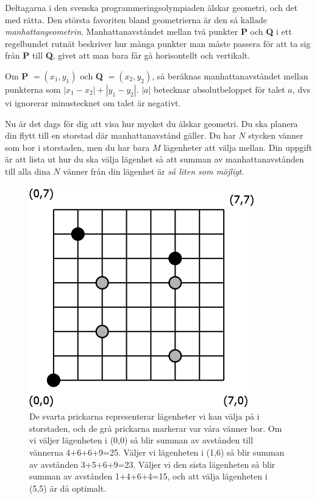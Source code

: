 
Deltagarna i den svenska programmeringsolympiaden älskar geometri, och det med rätta. Den största
favoriten bland geometrierna är den så kallade \emph{manhattangeometrin}. Manhattanavståndet
mellan två punkter \textbf{P} och \textbf{Q} i ett regelbundet rutnät beskriver hur många punkter
man måste passera för att ta sig från \textbf{P} till \textbf{Q}, givet att man bara får gå
horisontellt och vertikalt.

Om \textbf{P} $= (x_1,y_1)$ och \textbf{Q} $= (x_2,y_2)$, så beräknas manhattanavståndet mellan
punkterna som $|x_1-x_2| + |y_1-y_2|$. $|a|$ betecknar absolutbeloppet för talet $a$, dvs vi
ignorerar minustecknet om talet är negativt.

Nu är det dags för dig att visa hur mycket du älskar geometri. Du ska planera din flytt till
en storstad där manhattanavstånd gäller. Du har $N$ stycken vänner som bor i storstaden, men
du har bara $M$ lägenheter att välja mellan. Din uppgift är att lista ut hur du ska välja lägenhet
så att summan av manhattanavstånden till alla dina $N$ vänner från din lägenhet är \emph{så liten som möjligt}.

\begin{figure}[!h]
	\begin{center}
	\includegraphics[scale=0.4]{Storstad}
	\end{center}
	\caption{De svarta prickarna representerar lägenheter vi kan välja på i storstaden, och de grå prickarna markerar var våra vänner bor. Om vi väljer lägenheten i (0,0) så blir summan av avstånden till vännerna 4+6+6+9=25. Väljer vi lägenheten i (1,6) så blir summan av avstånden 3+5+6+9=23. Väljer vi den sista lägenheten så blir summan av avstånden 1+4+6+4=15, och att välja lägenheten i (5,5) är då optimalt.}
	\label{fig1}
\end{figure}

